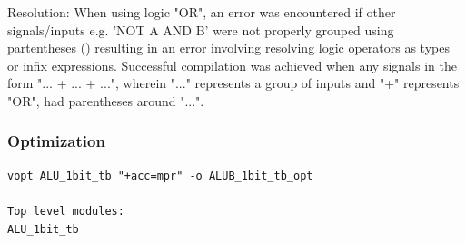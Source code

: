 \documentclass[paper=letter, fontsize=11pt]{scrartcl}
\numberwithin{equation}{section} %
\numberwithin{figure}{section} %
\numberwithin{table}{section} %
\begin{document}
Resolution: When using logic "OR", an error was encountered if other signals/inputs e.g. 'NOT A AND B' were not properly grouped using partentheses () resulting in an error involving resolving logic operators as types or infix expressions.
Successful compilation was achieved when any signals in the form "... + ... + ...", wherein "..." represents a group of inputs and "+" represents "OR", had  parentheses around "...".\\[20pt] 

\subsubsection{Optimization}
\begin{verbatim}
vopt ALU_1bit_tb "+acc=mpr" -o ALUB_1bit_tb_opt

Top level modules:
ALU_1bit_tb


\end{verbatim}
\end{document}

